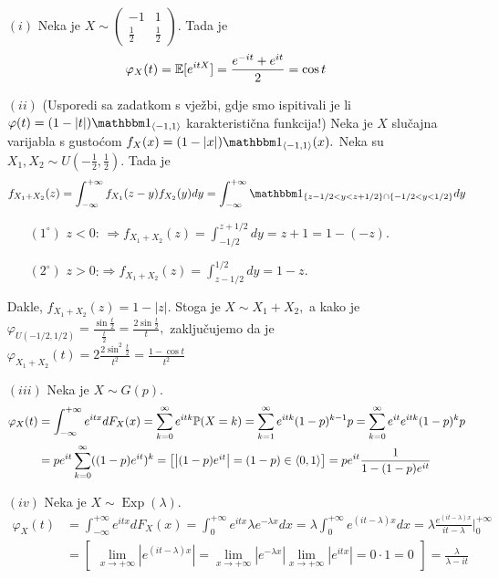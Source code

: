 \documentclass{article}
\newcommand{\Exp}{\operatorname{Exp}}
\begin{document}
\begin{enumerate}
    \item[\((i)\)] Neka je \(X\sim\begin{pmatrix}-1&1\\\frac12&\frac12\end{pmatrix}.\) Tada je \[\varphi_X(t)=\Bbb E[e^{itX}]=\frac{e^{-it}+e^{it}}2=\cos t\]
    \item[\((ii)\)] (Usporedi sa zadatkom s vježbi, gdje smo ispitivali je li \(\varphi(t)=(1-|t|)\mathbbm 1_{\langle-1,1\rangle}\) karakteristična funkcija!) Neka je \(X\) slučajna varijabla s gustoćom \(f_X(x)=(1-|x|)\mathbbm 1_{\langle-1,1\rangle}(x).\) Neka su \(X_1,X_2\sim U\left(-\frac12,\frac12\right).\) Tada je \[f_{X_1+X_2}(z)=\int_{-\infty}^{+\infty}f_{X_1}(z-y)f_{X_2}(y)dy=\int_{-\infty}^{+\infty}\mathbbm 1_{\{z-1/2<y<z+1/2\}\cap\{-1/2<y<1/2\}}dy\]\begin{enumerate}
        \item[\((1^\circ)\)] \(z<0\): \(\Rightarrow f_{X_1+X_2}(z)=\int_{-1/2}^{z+1/2}dy=z+1=1-(-z).\)
        \item[\((2^\circ)\)] \(z>0\):\(\Rightarrow f_{X_1+X_2}(z)=\int_{z-1/2}^{1/2}dy=1-z.\)
    \end{enumerate} Dakle, \(f_{X_1+X_2}(z)=1-|z|.\) Stoga je \(X\sim X_1+X_2,\) a kako je \(\varphi_{U(-1/2,1/2)}=\frac{\sin\frac{t}2}{\frac{t}2}=\frac{2\sin\frac{t}2}t,\) zaključujemo da je \(\varphi_{X_1+X_2}(t)=2\frac{2\sin^2\frac{t}2}{t^2}=\frac{1-\cos t}{t^2}\)
    \item[\((iii)\)] Neka je \(X\sim G(p).\) \[\begin{aligned}\varphi_X(t)&=\int_{-\infty}^{+\infty}e^{itx}dF_X(x)=\sum_{k=0}^\infty e^{itk}\Bbb P(X=k)=\sum_{k=1}^\infty e^{itk}(1-p)^{k-1}p=\sum_{k=0}^\infty e^{it}e^{itk}(1-p)^kp\\&=pe^{it}\sum_{k=0}^\infty((1-p)e^{it})^k=\begin{bmatrix}\left|(1-p)e^{it}\right|=(1-p)\in\langle0,1\rangle\end{bmatrix}=pe^{it}\frac1{1-(1-p)e^{it}}\end{aligned}\]
    \item[\((iv)\)] Neka je \(X\sim\Exp(\lambda).\) \[\begin{aligned}\varphi_X(t)&=\int_{-\infty}^{+\infty}e^{itx}dF_X(x)=\int_0^{+\infty}e^{itx}\lambda e^{-\lambda x}dx=\lambda\int_0^{+\infty}e^{(it-\lambda)x}dx=\lambda\frac{e^{(it-\lambda)x}}{it-\lambda}\Bigg|_0^{+\infty}\\&=\begin{bmatrix}\displaystyle\lim_{x\to+\infty}\left|e^{(it-\lambda)x}\right|=\lim_{x\to+\infty}\left|e^{-\lambda x}\right|\lim_{x\to+\infty}\left|e^{itx}\right|=0\cdot 1=0\end{bmatrix}=\frac\lambda{\lambda-it}\end{aligned}\]

\end{enumerate}
\end{document}
